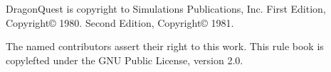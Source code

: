 \documentclass[a4paper]{report}
\begin{document}
\begin{Copyright}
DragonQuest is copyright to Simulations Publications, Inc. First Edition, Copyright© 1980. Second Edition, Copyright© 1981.

The named contributors assert their right to this work. This rule book is copylefted under the GNU Public License, version 2.0.
\end{Copyright}

\pagebreak

\begin{multicols}{3}
\tableofcontents
\end{multicols}




























































\end{document}
